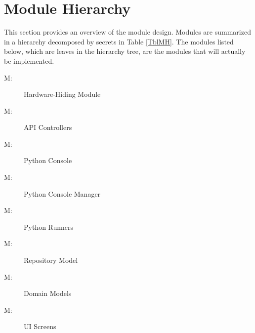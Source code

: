 \documentclass[12pt, titlepage]{article}
\newcounter{mnum}
\newcommand{\mthemnum}{M\themnum}
\begin{document}
\section{Module Hierarchy} \label{SecMH}

This section provides an overview of the module design. Modules are summarized
in a hierarchy decomposed by secrets in Table \ref{TblMH}. The modules listed
below, which are leaves in the hierarchy tree, are the modules that will
actually be implemented.

\begin{description}
\item [ \mthemnum \label{mHH}:] Hardware-Hiding Module
\item [ \mthemnum \label{mAC}:] API Controllers
\item [ \mthemnum \label{mPC}:] Python Console
\item [ \mthemnum \label{mPM}:] Python Console Manager
\item [ \mthemnum \label{mPR}:] Python Runners
\item [ \mthemnum \label{mRM}:] Repository Model
\item [ \mthemnum \label{mDM}:] Domain Models
\item [ \mthemnum \label{mUS}:] UI Screens
\end{description}
\end{document}
